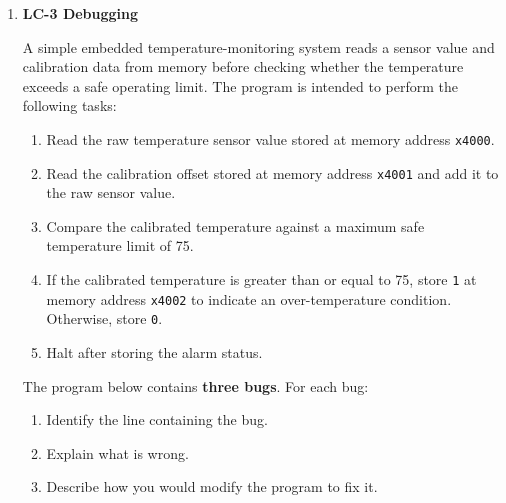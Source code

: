\documentclass{article}
\begin{document}
\begin{enumerate}[label=(\alph*)]
    \textcolor{purple}{RET}
    \newline \textcolor{gray}{; code omitted}
    \newline    \textcolor{gray}{;}
    \newline \textcolor{purple}{HALT}
    \textcolor{gray}{; labels below}
    \newline
    \textcolor{purple}{CLEARX2X3 .FILL 0xF00F}
    \newline
    \textcolor{purple}{FOUR .FILL \#4}
    \newline
    \textcolor{purple}{X2 .FILL 0x0F00}
    \newline
    \textcolor{purple}{X3 .FILL 0x00F0}
    \newline
    \textcolor{purple}{SAVER7 .FILL \#0}
    \newline
    \textcolor{purple}{.END}

\item \textbf{LC-3 Debugging}

A simple embedded temperature-monitoring system reads a sensor value and calibration data from memory before checking whether the temperature exceeds a safe operating limit. The program is intended to perform the following tasks:

\begin{enumerate}
    \item Read the raw temperature sensor value stored at memory address
    \texttt{x4000}.
    
    \item Read the calibration offset stored at memory address
    \texttt{x4001} and add it to the raw sensor value.
    
    \item Compare the calibrated temperature against a maximum safe temperature
    limit of 75.
    
    \item If the calibrated temperature is greater than or equal to 75, store
    \texttt{1} at memory address \texttt{x4002} to indicate an over-temperature
    condition. Otherwise, store \texttt{0}.
    
    \item Halt after storing the alarm status.
\end{enumerate}

The program below contains \textbf{three bugs}. For each bug:

\begin{enumerate}
    \item Identify the line containing the bug.
    \item Explain what is wrong.
    \item Describe how you would modify the program to fix it.
\end{enumerate}


\end{enumerate}
\end{document}
